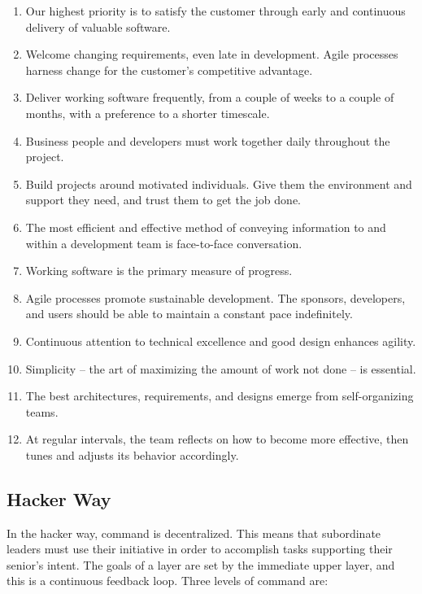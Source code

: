\documentclass{article}
\begin{document}
\begin{enumerate}
	\item Our highest priority is to satisfy the customer through early and continuous delivery of valuable software.
	\item Welcome changing requirements, even late in development. Agile processes harness change for the customer's competitive advantage.
	\item Deliver working software frequently, from a couple of weeks to a couple of months, with a preference to a shorter timescale.
	\item Business people and developers must work together daily throughout the project.
	\item Build projects around motivated individuals. Give them the environment and support they need, and trust them to get the job done.
	\item The most efficient and effective method of conveying information to and within a development team is face-to-face conversation.
	\item Working software is the primary measure of progress.
	\item Agile processes promote sustainable development. The sponsors, developers, and users should be able to maintain a constant pace indefinitely.
	\item Continuous attention to technical excellence and good design enhances agility.
	\item Simplicity -- the art of maximizing the amount of work not done -- is essential.
	\item The best architectures, requirements, and designs emerge from self-organizing teams.
	\item At regular intervals, the team reflects on how to become more effective, then tunes and adjusts its behavior accordingly.
\end{enumerate}

\subsection{Hacker Way}
In the hacker way, command is decentralized. This means that subordinate leaders must use their initiative in order to accomplish tasks supporting their senior's intent. The goals of a layer are set by the immediate upper layer, and this is a continuous feedback loop. Three levels of command are:
\end{document}
